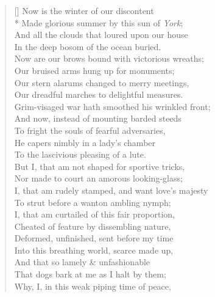 \documentclass[MAIN]{subfiles}
\begin{document}
\settowidth{\versewidth}{I, that am rudely stamped, and want love's majesty}
\begin{verse}[\versewidth]
Now is the winter of our discontent\\*
Made glorious summer by this sun of \emph{York};\\
And all the clouds that loured upon our house\\
In the deep bosom of the ocean buried.\\
Now are our brows bound with victorious wreaths;\\
Our bruised arms hung up for monuments;\\
Our stern alarums changed to merry meetings,\\
Our dreadful marches to delightful measures.\\
Grim-visaged war hath smoothed his wrinkled front;\\
And now, instead of mounting barded steeds\\
To fright the souls of fearful adversaries,\\
He capers nimbly in a lady's chamber\\
To the lascivious pleasing of a lute.\\
But I, that am not shaped for sportive tricks,\\
Nor made to court an amorous looking-glass;\\
I, that am rudely stamped, and want love's majesty\\
To strut before a wanton ambling nymph;\\
I, that am curtailed of this fair proportion,\\
Cheated of feature by dissembling nature,\\
Deformed, unfinished, sent before my time\\
Into this breathing world, scarce  made up,\\
And that so lamely \& unfashionable\\
That dogs bark at me as I halt by them;\\
Why, I, in this weak piping time of peace,\\

\end{verse}
\end{document}

